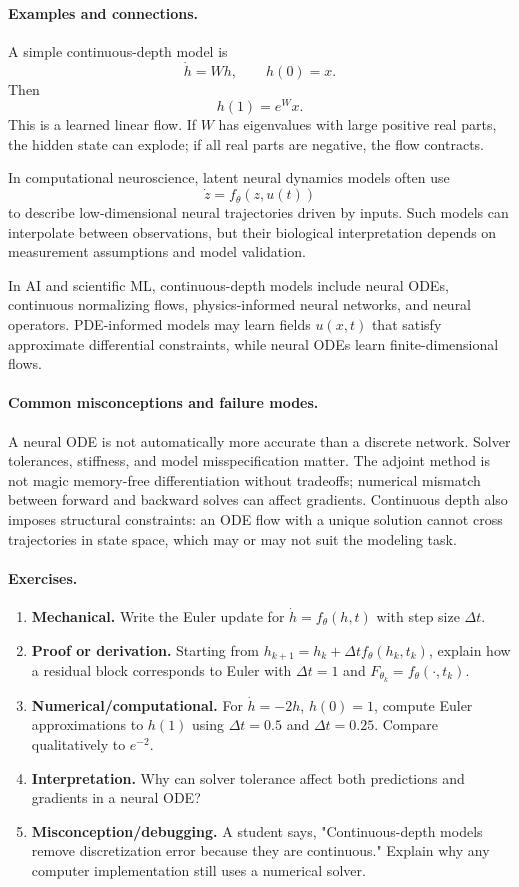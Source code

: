 \paragraph{Examples and connections.}
A simple continuous-depth model is
\[
\dot h=Wh,\qquad h(0)=x.
\]
Then
\[
h(1)=e^W x.
\]
This is a learned linear flow. If \(W\) has eigenvalues with large positive real parts, the hidden state can explode; if all real parts are negative, the flow contracts.

In computational neuroscience, latent neural dynamics models often use
\[
\dot z=f_\theta(z,u(t))
\]
to describe low-dimensional neural trajectories driven by inputs. Such models can interpolate between observations, but their biological interpretation depends on measurement assumptions and model validation.

In AI and scientific ML, continuous-depth models include neural ODEs, continuous normalizing flows, physics-informed neural networks, and neural operators. PDE-informed models may learn fields \(u(x,t)\) that satisfy approximate differential constraints, while neural ODEs learn finite-dimensional flows.

\paragraph{Common misconceptions and failure modes.}
A neural ODE is not automatically more accurate than a discrete network. Solver tolerances, stiffness, and model misspecification matter. The adjoint method is not magic memory-free differentiation without tradeoffs; numerical mismatch between forward and backward solves can affect gradients. Continuous depth also imposes structural constraints: an ODE flow with a unique solution cannot cross trajectories in state space, which may or may not suit the modeling task.

\paragraph{Exercises.}
\begin{enumerate}[label=\textbf{26.4.\arabic*.}, leftmargin=*]
\item \textbf{Mechanical.} Write the Euler update for \(\dot h=f_\theta(h,t)\) with step size \(\Delta t\).
\item \textbf{Proof or derivation.} Starting from \(h_{k+1}=h_k+\Delta t f_\theta(h_k,t_k)\), explain how a residual block corresponds to Euler with \(\Delta t=1\) and \(F_{\theta_k}=f_\theta(\cdot,t_k)\).
\item \textbf{Numerical/computational.} For \(\dot h=-2h\), \(h(0)=1\), compute Euler approximations to \(h(1)\) using \(\Delta t=0.5\) and \(\Delta t=0.25\). Compare qualitatively to \(e^{-2}\).
\item \textbf{Interpretation.} Why can solver tolerance affect both predictions and gradients in a neural ODE?
\item \textbf{Misconception/debugging.} A student says, "Continuous-depth models remove discretization error because they are continuous." Explain why any computer implementation still uses a numerical solver.
\end{enumerate}

